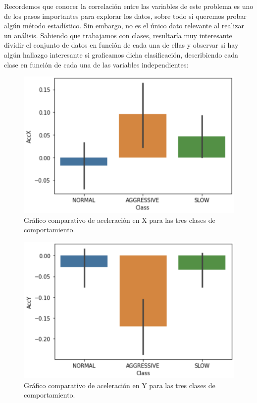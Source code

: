 \documentclass[runningheads]{llncs}
\begin{document}
\textsc Recordemos que conocer la correlación entre las variables de este problema es uno de los pasos importantes para explorar los datos, sobre todo si queremos probar algún método estadístico. Sin embargo, no es el único dato relevante al realizar un análisis. Sabiendo que trabajamos con clases, resultaría muy interesante dividir el conjunto de datos en función de cada una de ellas y observar si hay algún hallazgo interesante si graficamos dicha clasificación, describiendo cada clase en función de cada una de las variables independientes:  \\

    \begin{figure}
        \centering
        \includegraphics[width=1\columnwidth]{AccX.png}
        \caption{Gráfico comparativo de aceleración en X para las tres clases de comportamiento.}
        \label{fig:comand}%
    \end{figure}

    \begin{figure}
        \centering
        \includegraphics[width=1\columnwidth]{AccY.png}
        \caption{Gráfico comparativo de aceleración en Y para las tres clases de comportamiento.}
        \label{fig:comand}%
    \end{figure}
\end{document}
